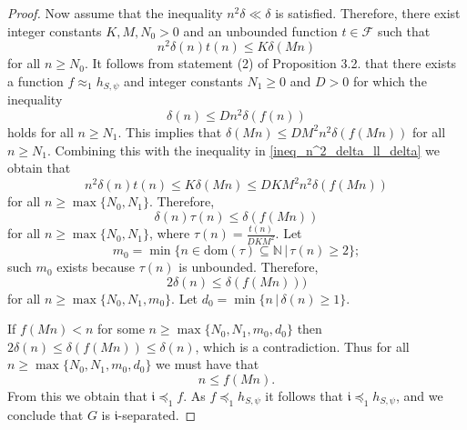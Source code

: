 \documentclass[11pt]{amsart}
\newcommand{\preceqF}{\preceq_1}
\theoremstyle{definition}
\newcommand\N{\mathbb N}
\newcommand\dom{\mathrm{dom}}
\newcommand{\ii}{\mathfrak{i}}
\renewcommand{\geq}{\geqslant} \renewcommand{\leq}{\leqslant} \renewcommand{\ge}{\geqslant} \renewcommand{\le}{\leqslant}
\begin{document}
\begin{proof}
Now assume that the inequality $n^2 \delta \ll \delta$
is satisfied.
Therefore, there exist integer constants $K,M,N_0 >0$ and an unbounded function $t \in \mathcal{F}$ such that
    \begin{equation}
    \label{ineq_n^2_delta_ll_delta}
      n^2 \delta (n) t(n) \leqslant K \delta (M n)
    \end{equation}
    for all $n \geqslant N_0$.
    It follows from statement (2) of Proposition 3.2. that there exists
    a function $f \approx_1 h_{S,\psi}$ and integer constants
    $N_1 \geqslant 0$ and $D>0$ for which
    the inequality
    \begin{equation*}
     \delta(n) \leqslant D n^2 \delta (f(n))
    \end{equation*}
    holds for all $n \geqslant N_1$.
    This implies that
    $\delta (Mn) \leqslant DM^2 n^2 \delta (f (Mn))$ for all
    $n \geqslant N_1$.
    Combining this with the inequality in \eqref{ineq_n^2_delta_ll_delta} we obtain
    that
    $$n^2 \delta (n) t(n) \leqslant K \delta (M n)
     \leqslant D K M^2 n^2 \delta (f(Mn))
    $$
    for all $n \geqslant  \max \{N_0, N_1\}$.
    Therefore,
    \begin{equation*}
       \delta (n) \tau (n) \leqslant  \delta (f(Mn))
    \end{equation*}
    for all $n \geqslant  \max \{N_0, N_1\}$, where
    $\tau (n) =  \frac{t(n)}{D K M^2}$.
    Let \[m_0 = \min\{n\in \dom(\tau)\subseteq  \N \, | \, \tau(n) \geqslant 2 \};\]
    such $m_0$ exists because $\tau(n)$ is unbounded.
    Therefore,
    \begin{equation*}
    \label{semifinal_ineq}
       2 \delta (n) \leqslant \delta (f(Mn)))
    \end{equation*}
    for all $n \geqslant \max \{N_0, N_1, m_0\}$.
    Let  $d_0 = \min\{n \, | \, \delta (n)
    	\geqslant 1\}$.
    	
    	If $f(Mn)<n$ for some
    $n \geqslant \max\{N_0, N_1, m_0, d_0\}$
    then $2\delta(n)\leq \delta(f(Mn))\leq \delta(n)$, which is a contradiction.
    Thus
for all $n\geq \max \{N_0, N_1, m_0, d_0\}$ we must have that
    \begin{equation*}
    \label{final_ineqAA}
        n \leqslant f(Mn).
    \end{equation*}
   From this we obtain that
   $\ii \preceqF f$. As $f \preceqF h_{S,\psi}$ it follows that
   $\ii\preceqF h_{S,\psi}$, and we conclude that $G$ is $\ii$-separated.
\end{proof}
\end{document}
